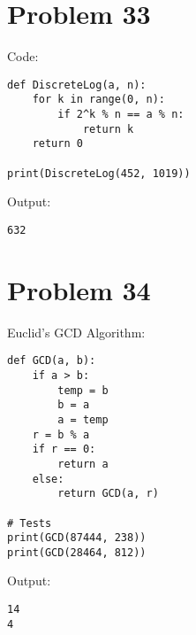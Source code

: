 \documentclass{article}
\theoremstyle{definition}
\begin{document}
\section*{Problem 33}
\begin{mdframed}
    Code:
    \begin{verbatim}
def DiscreteLog(a, n):
    for k in range(0, n):
        if 2^k % n == a % n:
            return k
    return 0

print(DiscreteLog(452, 1019))
    \end{verbatim}
    Output:
    \begin{verbatim}
632     
    \end{verbatim}
\end{mdframed}
\section*{Problem 34}
\begin{mdframed}
    Euclid's GCD Algorithm:
    \begin{verbatim}
def GCD(a, b):
    if a > b:
        temp = b
        b = a
        a = temp
    r = b % a
    if r == 0:
        return a
    else:
        return GCD(a, r)

# Tests
print(GCD(87444, 238))
print(GCD(28464, 812))
    \end{verbatim}
Output:
\begin{verbatim}
14
4
\end{verbatim}
\end{mdframed}
\end{document}
